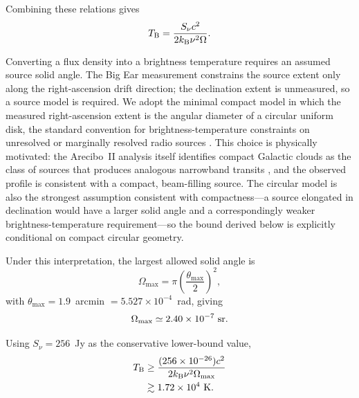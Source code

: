\documentclass[twocolumn]{aastex701}
\newcommand{\tbeq}{T_{\rm B}}
\newcommand{\snu}{S_\nu}
\begin{document}
Combining these relations gives
\begin{equation}
\tbeq=
\frac{\snu c^2}
{2k_{\rm B}\nu^2\Omega}.
\label{eq:tb}
\end{equation}

Converting a flux density into a brightness temperature requires an assumed source solid angle. The Big Ear measurement constrains the source extent only along the right-ascension drift direction; the declination extent is unmeasured, so a source model is required. We adopt the minimal compact model in which the measured right-ascension extent is the angular diameter of a circular uniform disk, the standard convention for brightness-temperature constraints on unresolved or marginally resolved radio sources \citep{condon2016}. This choice is physically motivated: the Arecibo~II analysis itself identifies compact Galactic  clouds as the class of sources that produces analogous narrowband transits \citep{mendez2025}, and the observed profile is consistent with a compact, beam-filling source. The circular model is also the strongest assumption consistent with compactness---a source elongated in declination would have a larger solid angle and a correspondingly weaker brightness-temperature requirement---so the bound derived below is explicitly conditional on compact circular geometry.

Under this interpretation, the largest allowed solid angle is
\begin{equation}
\Omega_{\max}
=
\pi\left(\frac{\theta_{\max}}{2}\right)^2,
\end{equation}
with $\theta_{\max}=1.9$~arcmin $=5.527\times10^{-4}$~rad, giving
\[
\Omega_{\max}\simeq2.40\times10^{-7}~{\rm sr}.
\]

Using $\snu=256$~Jy as the conservative lower-bound value,
\begin{align}
\tbeq
&\geq
\frac{(256\times10^{-26})c^2}
{2k_{\rm B}\nu^2\Omega_{\max}}
\nonumber\\
&\gtrsim
1.72\times10^4~{\rm K}.
\label{eq:tb_bound}
\end{align}
\end{document}
